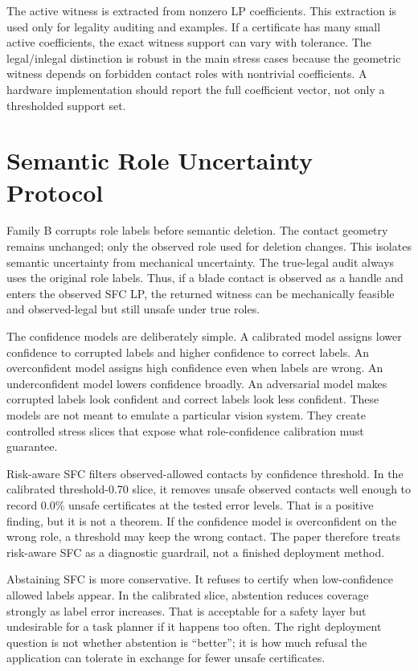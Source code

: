 \documentclass{article}
\begin{document}
The active witness is extracted from nonzero LP coefficients. This extraction is used only for legality auditing and examples. If a certificate has many small active coefficients, the exact witness support can vary with tolerance. The legal/inlegal distinction is robust in the main stress cases because the geometric witness depends on forbidden contact roles with nontrivial coefficients. A hardware implementation should report the full coefficient vector, not only a thresholded support set.

\section{Semantic Role Uncertainty Protocol}

Family B corrupts role labels before semantic deletion. The contact geometry remains unchanged; only the observed role used for deletion changes. This isolates semantic uncertainty from mechanical uncertainty. The true-legal audit always uses the original role labels. Thus, if a blade contact is observed as a handle and enters the observed SFC LP, the returned witness can be mechanically feasible and observed-legal but still unsafe under true roles.

The confidence models are deliberately simple. A calibrated model assigns lower confidence to corrupted labels and higher confidence to correct labels. An overconfident model assigns high confidence even when labels are wrong. An underconfident model lowers confidence broadly. An adversarial model makes corrupted labels look confident and correct labels look less confident. These models are not meant to emulate a particular vision system. They create controlled stress slices that expose what role-confidence calibration must guarantee.

Risk-aware SFC filters observed-allowed contacts by confidence threshold. In the calibrated threshold-0.70 slice, it removes unsafe observed contacts well enough to record 0.0\% unsafe certificates at the tested error levels. That is a positive finding, but it is not a theorem. If the confidence model is overconfident on the wrong role, a threshold may keep the wrong contact. The paper therefore treats risk-aware SFC as a diagnostic guardrail, not a finished deployment method.

Abstaining SFC is more conservative. It refuses to certify when low-confidence allowed labels appear. In the calibrated slice, abstention reduces coverage strongly as label error increases. That is acceptable for a safety layer but undesirable for a task planner if it happens too often. The right deployment question is not whether abstention is ``better''; it is how much refusal the application can tolerate in exchange for fewer unsafe certificates.
\end{document}
